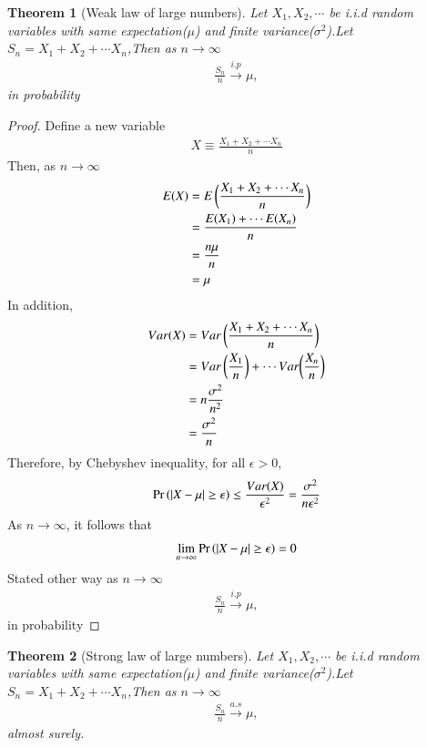 \documentclass[journal,12pt,twocolumn]{IEEEtran}
\newtheorem{theorem}{Theorem}[section]
\begin{document}
\begin{theorem}[Weak law of large numbers]
\label{theorem}
Let $X_1,X_2,\cdots $ be i.i.d random variables with same expectation($\mu$) and finite variance($\sigma^2$).Let $S_{n}=X_1+X_2+\cdots X_n$,Then as $n \to \infty$
\begin{align}
    \frac{S_n}{n} \xrightarrow{i.p}  \mu,
\end{align}
in probability
\end{theorem}
\begin{proof}
Define a new variable
\begin{align}
    X \equiv \frac{X_1+X_2+\cdots X_n}{n}
\end{align}
Then, as $n \to \infty$
\begin{align}
    E(X)&=E\left(\frac{X_1+X_2+\cdots X_n}{n}\right)\\
    &=\frac{E(X_1)+\cdots E(X_n)}{n}\\
    &=\frac{n \mu}{n}\\
    &=\mu
\end{align}
In addition,
\begin{align}
    Var(X)&=Var\left(\frac{X_1+X_2+\cdots X_n}{n}\right)\\
    &=Var\left(\frac{X_1}{n}\right)+\cdots Var{\left(\frac{X_n}{n}\right)}\\
    &=n\frac{\sigma^2}{n^2}\\
    &=\frac{\sigma^2}{n}
\end{align}
Therefore, by Chebyshev inequality, for all $\epsilon>0$,
\begin{align}
   \Pr\left(|X-\mu| \geq \epsilon\right) \leq \frac{Var(X)}{\epsilon^2}=\frac{\sigma^2}{n\epsilon^2}   
\end{align}
As $n \to \infty$, it follows that
\begin{align}
    \lim_{n \to \infty} \Pr\left(|X-\mu| \geq \epsilon\right)=0
\end{align}
Stated other way as $n \to \infty$
\begin{align}
    \frac{S_n}{n} \xrightarrow{i.p}  \mu,
\end{align}
in probability 
\end{proof}


 \begin{theorem}[Strong law of large numbers]
\label{theorem1}
Let $X_1,X_2,\cdots $ be i.i.d random variables with same expectation($\mu$) and finite variance($\sigma^2$).Let $S_{n}=X_1+X_2+\cdots X_n$,Then as $n \to \infty$
\begin{align}
    \frac{S_n}{n} \xrightarrow{a.s}  \mu,
\end{align}
almost surely.
\end{theorem}
\end{document}
